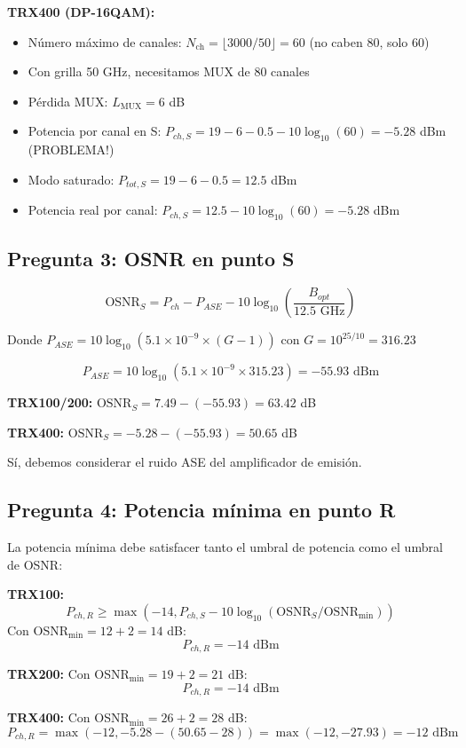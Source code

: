 \documentclass[a4paper,11pt]{article}
\begin{document}
\textbf{TRX400 (DP-16QAM):}
\begin{itemize}
    \item Número máximo de canales: $N_{\text{ch}} = \lfloor 3000/50 \rfloor = 60$ (no caben 80, solo 60)
    \item Con grilla 50 GHz, necesitamos MUX de 80 canales
    \item Pérdida MUX: $L_{\text{MUX}} = 6$ dB
    \item Potencia por canal en S: $P_{ch,S} = 19 - 6 - 0.5 - 10\log_{10}(60) = -5.28$ dBm (PROBLEMA!)
    \item Modo saturado: $P_{tot,S} = 19 - 6 - 0.5 = 12.5$ dBm
    \item Potencia real por canal: $P_{ch,S} = 12.5 - 10\log_{10}(60) = -5.28$ dBm
\end{itemize}

\subsection*{Pregunta 3: OSNR en punto S}

$$\text{OSNR}_S = P_{ch} - P_{ASE} - 10\log_{10}\left(\frac{B_{opt}}{12.5 \text{ GHz}}\right)$$

Donde $P_{ASE} = 10\log_{10}(5.1 \times 10^{-9} \times (G-1))$ con $G = 10^{25/10} = 316.23$

$$P_{ASE} = 10\log_{10}(5.1 \times 10^{-9} \times 315.23) = -55.93 \text{ dBm}$$

\textbf{TRX100/200:} $\text{OSNR}_S = 7.49 - (-55.93) = 63.42$ dB

\textbf{TRX400:} $\text{OSNR}_S = -5.28 - (-55.93) = 50.65$ dB

Sí, debemos considerar el ruido ASE del amplificador de emisión.

\subsection*{Pregunta 4: Potencia mínima en punto R}

La potencia mínima debe satisfacer tanto el umbral de potencia como el umbral de OSNR:

\textbf{TRX100:}
$$P_{ch,R} \geq \max(-14, P_{ch,S} - 10\log_{10}(\text{OSNR}_S/\text{OSNR}_{\text{min}}))$$
Con OSNR$_{\text{min}} = 12 + 2 = 14$ dB:
$$P_{ch,R} = -14 \text{ dBm}$$

\textbf{TRX200:}
Con OSNR$_{\text{min}} = 19 + 2 = 21$ dB:
$$P_{ch,R} = -14 \text{ dBm}$$

\textbf{TRX400:}
Con OSNR$_{\text{min}} = 26 + 2 = 28$ dB:
$$P_{ch,R} = \max(-12, -5.28 - (50.65 - 28)) = \max(-12, -27.93) = -12 \text{ dBm}$$
\end{document}
